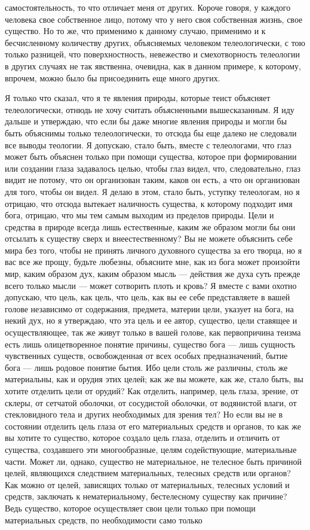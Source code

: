 \documentclass[12pt]{article}
\begin{document}
самостоятельность, то что отличает меня от других. Короче говоря, у каждого человека свое собственное лицо, потому что у него своя собственная жизнь, свое существо. Но то же, что применимо к данному случаю, применимо и к бесчисленному количеству других, объясняемых человеком телеологически, с тою только разницей, что поверхностность, невежество и смехотворность телеологии в других случаях не так явственна, очевидна, как в данном примере, к которому, впрочем, можно было бы присоединить еще много других. 

Я только что сказал, что я те явления природы, которые теист объясняет телеологически, отнюдь не хочу считать объясненными вышесказанным. Я иду дальше и утверждаю, что если бы даже многие явления природы и могли бы быть объяснимы только телеологически, то отсюда бы еще далеко не следовали все выводы теологии. Я допускаю, стало быть, вместе с телеологами, что глаз может быть объяснен только при помощи существа, которое при формировании или создании глаза задавалось целью, чтобы глаз видел, что, следовательно, глаз видит не потому, что он организован таким, каков он есть, а что он организован для того, чтобы он видел. Я делаю в этом, стало быть, уступку телеологам, но я отрицаю, что отсюда вытекает наличность существа, к которому подходит имя бога, отрицаю, что мы тем самым выходим из пределов природы. Цели и средства в природе всегда лишь естественные, каким же образом могли бы они отсылать к существу сверх и внеестественному? Вы не можете объяснить себе мира без того, чтобы не принять личного духовного существа за его творца, но я вас все же прощу, будьте любезны, объясните мне, как из бога может произойти мир, каким образом дух, каким образом мысль --- действия же духа суть прежде всего только мысли --- может сотворить плоть и кровь? Я вместе с вами охотно допускаю, что цель, как цель, что цель, как вы ее себе представляете в вашей голове независимо от содержания, предмета, материи цели, указует на бога, на некий дух, но я утверждаю, что эта цель и ее автор, существо, цели ставящее и осуществляющее, так же живут только в вашей голове, как первопричина теизма есть лишь олицетворенное понятие причины, существо бога --- лишь сущность чувственных существ, освобожденная от всех особых предназначений, бытие бога --- лишь родовое понятие бытия. Ибо цели столь же различны, столь же материальны, как и орудия этих целей; как же вы можете, как же, стало быть, вы хотите отделить цели от орудий? Как отделить, например, цель глаза, зрение, от склеры, от сетчатой оболочки, от сосудистой оболочки, от водянистой влаги, от стекловидного тела и других необходимых для зрения тел? Но если вы не в состоянии отделить цель глаза от его материальных средств и органов, то как же вы хотите то существо, которое создало цель глаза, отделить и отличить от существа, создавшего эти многообразные, целям содействующие, материальные части. Может ли, однако, существо не материальное, не телесное быть причиной целей, являющихся следствием материальных, телесных средств или органов? Как можно от целей, зависящих только от материальных, телесных условий и средств, заключать к нематериальному, бестелесному существу как причине? Ведь существо, которое осуществляет свои цели только при помощи материальных средств, по необходимости само только 
\end{document}
